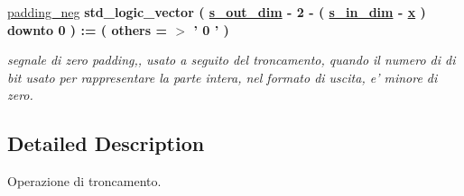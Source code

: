 \begin{DoxyCompactItemize}
\hyperlink{group___truncate_ga130836df2917c4b75d1fc24500082e76}{padding\+\_\+neg} {\bfseries \textcolor{vhdlchar}{std\+\_\+logic\+\_\+vector}\textcolor{vhdlchar}{ }\textcolor{vhdlchar}{(}\textcolor{vhdlchar}{ }\textcolor{vhdlchar}{ }\textcolor{vhdlchar}{ }\textcolor{vhdlchar}{ }{\bfseries \hyperlink{group___truncate_ga8b62f8bfecb0fab845995b8b051101bc}{s\+\_\+out\+\_\+dim}} \textcolor{vhdlchar}{-\/}\textcolor{vhdlchar}{ } \textcolor{vhdldigit}{2} \textcolor{vhdlchar}{-\/}\textcolor{vhdlchar}{ }\textcolor{vhdlchar}{(}\textcolor{vhdlchar}{ }\textcolor{vhdlchar}{ }\textcolor{vhdlchar}{ }\textcolor{vhdlchar}{ }{\bfseries \hyperlink{group___truncate_gad3d18243ad6fe53a2277e2aa9b94ca45}{s\+\_\+in\+\_\+dim}} \textcolor{vhdlchar}{-\/}\textcolor{vhdlchar}{ }\textcolor{vhdlchar}{ }\textcolor{vhdlchar}{ }{\bfseries \hyperlink{group___truncate_ga63701d8af27da7452a7588efcff357bc}{x}} \textcolor{vhdlchar}{ }\textcolor{vhdlchar}{)}\textcolor{vhdlchar}{ }\textcolor{vhdlchar}{ }\textcolor{vhdlchar}{downto}\textcolor{vhdlchar}{ }\textcolor{vhdlchar}{ } \textcolor{vhdldigit}{0} \textcolor{vhdlchar}{ }\textcolor{vhdlchar}{)}\textcolor{vhdlchar}{ }\textcolor{vhdlchar}{ }\textcolor{vhdlchar}{ }\textcolor{vhdlchar}{\+:}\textcolor{vhdlchar}{=}\textcolor{vhdlchar}{ }\textcolor{vhdlchar}{(}\textcolor{vhdlchar}{ }\textcolor{vhdlchar}{ }\textcolor{vhdlchar}{others}\textcolor{vhdlchar}{ }\textcolor{vhdlchar}{ }\textcolor{vhdlchar}{=}\textcolor{vhdlchar}{ }\textcolor{vhdlchar}{$>$}\textcolor{vhdlchar}{ }\textcolor{vhdlchar}{'}\textcolor{vhdlchar}{ } \textcolor{vhdldigit}{0} \textcolor{vhdlchar}{ }\textcolor{vhdlchar}{'}\textcolor{vhdlchar}{ }\textcolor{vhdlchar}{)}\textcolor{vhdlchar}{ }} 
\begin{DoxyCompactList}\small\item\em segnale di zero padding,, usato a seguito del troncamento, quando il numero di di bit usato per rappresentare la parte intera, nel formato di uscita, e' minore di zero. \end{DoxyCompactList}\end{DoxyCompactItemize}


\subsection{Detailed Description}
Operazione di troncamento. 



